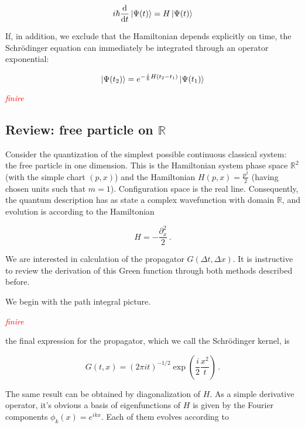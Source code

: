 \documentclass{article}
\newcommand{\ar}{\ensuremath{\mathbb{R}}}
\newcommand{\cmnt}[1]{\textcolor{red}{\emph{#1}}}
\begin{document}
\begin{equation}
    i \hbar \dv{t}\ket{\Psi(t)} = H \ket{\Psi(t)}
\end{equation}


If, in addition, we exclude that the Hamiltonian depends explicitly on time, the Schr\"odinger equation can immediately be integrated through an operator exponential:

\begin{equation}
    \ket{\Psi(t_2)} = e^{-\frac{i}{\hbar} H (t_2-t_1)} \ket{\Psi(t_1)} 
\end{equation}


\cmnt{finire}

\subsection{Review: free particle on $\mathbb{R}$}

Consider the quantization of the simplest possible continuous classical system: the free particle in one dimension. This is the Hamiltonian system phase space $\ar^2$ (with the simple chart $(p,x)$) and the Hamiltonian $H(p,x) = \frac{p^2}{2}$ (having chosen units such that $m=1$). Configuration space is the real line. Consequently, the quantum description has as state a complex wavefunction with domain $\ar$, and evolution is according to the Hamiltonian

\begin{equation}
    H = - \frac{\partial_x^2}{2}\,.
\end{equation}

We are interested in calculation of the propagator $G(\Delta t, \Delta x)$. It is instructive to review the derivation of this Green function through both methods described before.

We begin with the path integral picture.

\cmnt{finire}

the final expression for the propagator, which we call the Schr\"odinger kernel, is 

\begin{equation}
    G(t,x) = (2\pi i t)^{-1/2} \exp(\frac{i}{2} \frac{x^2}{t})\,.
\end{equation}

The same result can be obtained by diagonalization of $H$. As a simple derivative operator, it's obvious a basis of eigenfunctions of $H$ is given by the Fourier components $\phi_k(x) = e^{ikx}$. Each of them evolves according to
\end{document}
